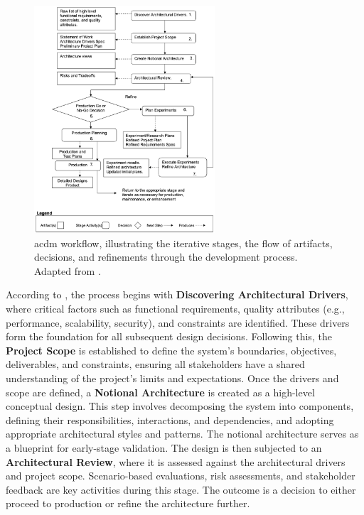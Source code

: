 \begin{figure}[!htb]
    \caption[\acl{acdm} Workflow]{\ac{acdm} workflow, illustrating the iterative stages, the flow of artifacts, decisions, and refinements through the development process. Adapted from .}
    \label{fig:acdm_workflow}
    \includegraphics[width=0.6\textwidth]{figs/chapter3/acdm_workflow.png}
    \centering
\end{figure}

According to , the process begins with \textbf{Discovering Architectural Drivers}, where critical factors such as functional requirements, quality attributes (e.g., performance, scalability, security), and constraints are identified. These drivers form the foundation for all subsequent design decisions. Following this, the \textbf{Project Scope} is established to define the system's boundaries, objectives, deliverables, and constraints, ensuring all stakeholders have a shared understanding of the project's limits and expectations. Once the drivers and scope are defined, a \textbf{Notional Architecture} is created as a high-level conceptual design. This step involves decomposing the system into components, defining their responsibilities, interactions, and dependencies, and adopting appropriate architectural styles and patterns. The notional architecture serves as a blueprint for early-stage validation. The design is then subjected to an \textbf{Architectural Review}, where it is assessed against the architectural drivers and project scope. Scenario-based evaluations, risk assessments, and stakeholder feedback are key activities during this stage. The outcome is a decision to either proceed to production or refine the architecture further.

